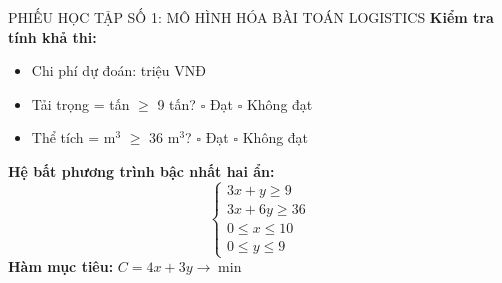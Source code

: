 \documentclass[12pt,a4paper]{article}
\begin{document}
\begin{phieuhoctap}{PHIẾU HỌC TẬP SỐ 1: MÔ HÌNH HÓA BÀI TOÁN LOGISTICS}
\vspace{0.3cm}
\textbf{Kiểm tra tính khả thi:}
\begin{itemize}
\item Chi phí dự đoán: \underline{\hspace{4cm}} triệu VNĐ
\item Tải trọng = \underline{\hspace{2cm}} tấn $\ge$ 9 tấn? \quad $\square$ Đạt \quad $\square$ Không đạt
\item Thể tích = \underline{\hspace{2cm}} m$^3$ $\ge$ 36 m$^3$? \quad $\square$ Đạt \quad $\square$ Không đạt
\end{itemize}

\begin{congthuc}
\textbf{Hệ bất phương trình bậc nhất hai ẩn:}
$$\begin{cases}
3x + y \ge 9 \\
3x + 6y \ge 36 \\
0 \le x \le 10 \\
0 \le y \le 9
\end{cases}$$
\textbf{Hàm mục tiêu:} $C = 4x + 3y \to \min$
\end{congthuc}
\end{phieuhoctap}
\end{document}
